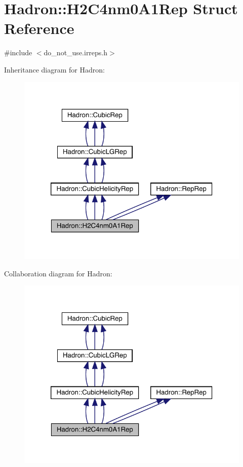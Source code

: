 \hypertarget{structHadron_1_1H2C4nm0A1Rep}{}\section{Hadron\+:\+:H2\+C4nm0\+A1\+Rep Struct Reference}
\label{structHadron_1_1H2C4nm0A1Rep}


{\ttfamily \#include $<$do\+\_\+not\+\_\+use.\+irreps.\+h$>$}



Inheritance diagram for Hadron\+:
\nopagebreak
\begin{figure}[H]
\begin{center}
\leavevmode
\includegraphics[width=320pt]{d9/dc6/structHadron_1_1H2C4nm0A1Rep__inherit__graph}
\end{center}
\end{figure}


Collaboration diagram for Hadron\+:
\nopagebreak
\begin{figure}[H]
\begin{center}
\leavevmode
\includegraphics[width=320pt]{d7/d42/structHadron_1_1H2C4nm0A1Rep__coll__graph}
\end{center}
\end{figure}
